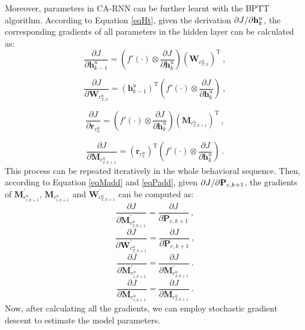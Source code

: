 \documentclass[conference]{IEEEtran}
\begin{document}
Moreover, parameters in CA-RNN can be further learnt with the BPTT algorithm. According to Equation \ref{eqHt}, given the derivation ${\partial J \mathord{\left/ \right. \kern-\nulldelimiterspace} {\partial \mathbf{h}_{k}^{u} } }$, the corresponding gradients of all parameters in the hidden layer can be calculated as: 
\begin{displaymath}
\frac{{\partial J}}{{\partial \mathbf{h}^u_{k-1} }} =  \left( {f'\left(  \cdot  \right) \otimes \frac{{\partial J}}{{\partial \mathbf{h}^u_{k} }}} \right)\left({\mathbf{W}_{c_{T,k}^{u}}}\right)^\mathrm{T} ~,
\end{displaymath}

\begin{displaymath}
\frac{{\partial J}}{{\partial {\mathbf{W}_{c_{T,k}^{u}}} }} =  \left({\mathbf{h}_{k-1}^u}\right)^\mathrm{T}\left( {f'\left(  \cdot  \right) \otimes \frac{{\partial J}}{{\partial \mathbf{h}^u_{k} }}} \right) ~,
\end{displaymath}

\begin{displaymath}
\frac{{\partial J}}{{\partial \mathbf{r}_{v_k^u} }} =  \left( {f'\left(  \cdot  \right) \otimes \frac{{\partial J}}{{\partial \mathbf{h}^u_{k} }}} \right)\left({\mathbf{M}_{c^u_{I,k+1}}}\right)^\mathrm{T} ~,
\end{displaymath}

\begin{displaymath}
\frac{{\partial J}}{{\partial {\mathbf{M}_{c^u_{I,k+1}}} }} =  \left({\mathbf{r}_{v^u_k}}\right)^\mathrm{T}\left( {f'\left(  \cdot  \right) \otimes \frac{{\partial J}}{{\partial \mathbf{h}^u_{k} }}} \right) ~.
\end{displaymath}
This process can be repeated iteratively in the whole behavioral sequence. 
Then, according to Equation \ref{eqMadd} and \ref{eqPadd}, given ${\partial J \mathord{\left/ \right. \kern-\nulldelimiterspace} {\partial \mathbf{P}_{c,k+1} } }$, the gradients of $\mathbf{M}^{'}_{c^u_{i,k+1}}$, $\mathbf{M}_{c^u_{i,k+1}}$ and $\mathbf{W}^{'}_{c_{T,k+1}^{u}}$ can be computed as: 
\begin{displaymath}
\frac{{\partial J}}{{\partial {\mathbf{M}^{'}_{c^u_{I,k+1}}} }} =  \frac{\partial J}{\partial \mathbf{P}_{c,k+1}} ~,
\end{displaymath}
\begin{displaymath}
\frac{{\partial J}}{{\partial {\mathbf{W}^{'}_{c_{T,k+1}^{u}}} }} =  \frac{\partial J}{\partial \mathbf{P}_{c,k+1}} ~,
\end{displaymath}
\begin{displaymath}
\frac{{\partial J}}{{\partial {\mathbf{M}^{'}_{c^u_{i,k+1}}} }} =  \frac{\partial J}{\partial \mathbf{M}^{'}_{c^u_{I,k+1}}} ~.
\end{displaymath}
\begin{displaymath}
\frac{{\partial J}}{{\partial {\mathbf{M}_{c^u_{i,k+1}}} }} =  \frac{\partial J}{\partial \mathbf{M}_{c^u_{I,k+1}}} ~.
\end{displaymath}
Now, after calculating all the gradients, we can employ stochastic gradient descent to estimate the model parameters. 
\end{document}
